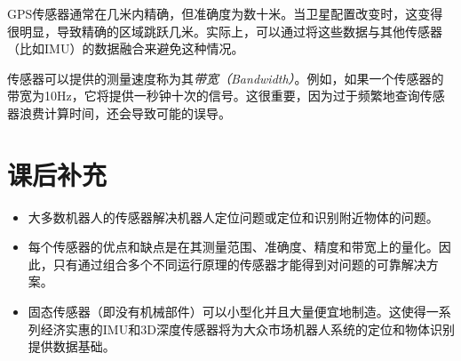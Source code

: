 GPS传感器通常在几米内精确，但准确度为数十米。当卫星配置改变时，这变得很明显，导致精确的区域跳跃几米。实际上，可以通过将这些数据与其他传感器（比如IMU）的数据融合来避免这种情况。


传感器可以提供的测量速度称为其\emph{带宽（Bandwidth）}。例如，如果一个传感器的带宽为10Hz，它将提供一秒钟十次的信号。这很重要，因为过于频繁地查询传感器浪费计算时间，还会导致可能的误导。

\section*{课后补充}
\begin{itemize}

\item 大多数机器人的传感器解决机器人定位问题或定位和识别附近物体的问题。
\item 每个传感器的优点和缺点是在其测量范围、准确度、精度和带宽上的量化。因此，只有通过组合多个不同运行原理的传感器才能得到对问题的可靠解决方案。
\item 固态传感器（即没有机械部件）可以小型化并且大量便宜地制造。这使得一系列经济实惠的IMU和3D深度传感器将为大众市场机器人系统的定位和物体识别提供数据基础。
\end{itemize}

